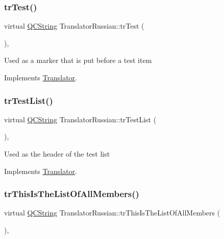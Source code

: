 \subsubsection{\texorpdfstring{trTest()}{trTest()}}
{\footnotesize\ttfamily virtual \mbox{\hyperlink{class_q_c_string}{Q\+C\+String}} Translator\+Russian\+::tr\+Test (\begin{DoxyParamCaption}{ }\end{DoxyParamCaption})\hspace{0.3cm}{\ttfamily [inline]}, {\ttfamily [virtual]}}

Used as a marker that is put before a test item 

Implements \mbox{\hyperlink{class_translator}{Translator}}.

\mbox{\label{class_translator_russian_a6b7a7289949ac25a9c8b75669e65c6c2}} 
\subsubsection{\texorpdfstring{trTestList()}{trTestList()}}
{\footnotesize\ttfamily virtual \mbox{\hyperlink{class_q_c_string}{Q\+C\+String}} Translator\+Russian\+::tr\+Test\+List (\begin{DoxyParamCaption}{ }\end{DoxyParamCaption})\hspace{0.3cm}{\ttfamily [inline]}, {\ttfamily [virtual]}}

Used as the header of the test list 

Implements \mbox{\hyperlink{class_translator}{Translator}}.

\mbox{\label{class_translator_russian_aca74da9a2def6ae873caeb10cb3aa828}} 
\subsubsection{\texorpdfstring{trThisIsTheListOfAllMembers()}{trThisIsTheListOfAllMembers()}}
{\footnotesize\ttfamily virtual \mbox{\hyperlink{class_q_c_string}{Q\+C\+String}} Translator\+Russian\+::tr\+This\+Is\+The\+List\+Of\+All\+Members (\begin{DoxyParamCaption}{ }\end{DoxyParamCaption})\hspace{0.3cm}{\ttfamily [inline]}, {\ttfamily [virtual]}}

